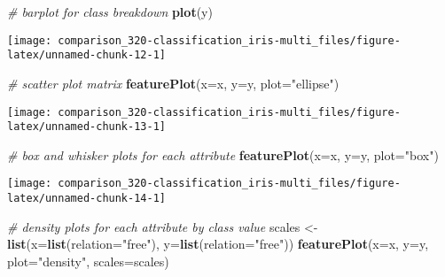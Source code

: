\documentclass[]{book}
\newenvironment{Shaded}{\begin{snugshade}}{\end{snugshade}}
\newcommand{\CommentTok}[1]{\textcolor[rgb]{0.56,0.35,0.01}{\textit{#1}}}
\newcommand{\DataTypeTok}[1]{\textcolor[rgb]{0.13,0.29,0.53}{#1}}
\newcommand{\KeywordTok}[1]{\textcolor[rgb]{0.13,0.29,0.53}{\textbf{#1}}}
\newcommand{\NormalTok}[1]{#1}
\newcommand{\StringTok}[1]{\textcolor[rgb]{0.31,0.60,0.02}{#1}}
\begin{document}
\begin{Shaded}
\begin{Highlighting}[]
\CommentTok{# barplot for class breakdown}
\KeywordTok{plot}\NormalTok{(y)}
\end{Highlighting}
\end{Shaded}

\begin{center}\texttt{[image: comparison\_320-classification\_iris-multi\_files/figure-latex/unnamed-chunk-12-1]} \end{center}

\begin{Shaded}
\begin{Highlighting}[]
\CommentTok{# scatter plot matrix}
\KeywordTok{featurePlot}\NormalTok{(}\DataTypeTok{x=}\NormalTok{x, }\DataTypeTok{y=}\NormalTok{y, }\DataTypeTok{plot=}\StringTok{"ellipse"}\NormalTok{)}
\end{Highlighting}
\end{Shaded}

\begin{center}\texttt{[image: comparison\_320-classification\_iris-multi\_files/figure-latex/unnamed-chunk-13-1]} \end{center}

\begin{Shaded}
\begin{Highlighting}[]
\CommentTok{# box and whisker plots for each attribute}
\KeywordTok{featurePlot}\NormalTok{(}\DataTypeTok{x=}\NormalTok{x, }\DataTypeTok{y=}\NormalTok{y, }\DataTypeTok{plot=}\StringTok{"box"}\NormalTok{)}
\end{Highlighting}
\end{Shaded}

\begin{center}\texttt{[image: comparison\_320-classification\_iris-multi\_files/figure-latex/unnamed-chunk-14-1]} \end{center}

\begin{Shaded}
\begin{Highlighting}[]
\CommentTok{# density plots for each attribute by class value}
\NormalTok{scales <-}\StringTok{ }\KeywordTok{list}\NormalTok{(}\DataTypeTok{x=}\KeywordTok{list}\NormalTok{(}\DataTypeTok{relation=}\StringTok{"free"}\NormalTok{), }\DataTypeTok{y=}\KeywordTok{list}\NormalTok{(}\DataTypeTok{relation=}\StringTok{"free"}\NormalTok{))}
\KeywordTok{featurePlot}\NormalTok{(}\DataTypeTok{x=}\NormalTok{x, }\DataTypeTok{y=}\NormalTok{y, }\DataTypeTok{plot=}\StringTok{"density"}\NormalTok{, }\DataTypeTok{scales=}\NormalTok{scales)}
\end{Highlighting}
\end{Shaded}
\end{document}
